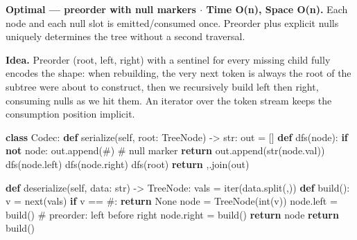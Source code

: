\documentclass[11pt]{article}
\newenvironment{Shaded}{\begin{snugshade}}{\end{snugshade}}
\newcommand{\BuiltInTok}[1]{\textcolor[rgb]{0.50,0.55,0.55}{#1}}
\newcommand{\CommentTok}[1]{\textcolor[rgb]{0.48,0.49,0.49}{#1}}
\newcommand{\ControlFlowTok}[1]{\textcolor[rgb]{0.99,0.74,0.29}{\textbf{#1}}}
\newcommand{\KeywordTok}[1]{\textcolor[rgb]{0.81,0.81,0.76}{\textbf{#1}}}
\newcommand{\NormalTok}[1]{\textcolor[rgb]{0.81,0.81,0.76}{#1}}
\newcommand{\OperatorTok}[1]{\textcolor[rgb]{0.81,0.81,0.76}{#1}}
\newcommand{\StringTok}[1]{\textcolor[rgb]{0.96,0.31,0.31}{#1}}
\newcommand{\VariableTok}[1]{\textcolor[rgb]{0.15,0.68,0.68}{#1}}
\begin{document}
\textbf{Optimal --- preorder with null markers \(\cdot\) Time O(n), Space O(n).} Each node and each null slot is emitted/consumed once. Preorder plus explicit nulls uniquely determines the tree without a second traversal.

\textbf{Idea.} Preorder (root, left, right) with a sentinel for every missing child fully encodes the shape: when rebuilding, the very next token is always the root of the subtree we\textquotesingle re about to construct, then we recursively build left then right, consuming nulls as we hit them. An iterator over the token stream keeps the consumption position implicit.


\begin{Shaded}
\begin{Highlighting}[]
\KeywordTok{class}\NormalTok{ Codec:}
    \KeywordTok{def}\NormalTok{ serialize(}\VariableTok{self}\NormalTok{, root: TreeNode) }\OperatorTok{{-}\textgreater{}} \BuiltInTok{str}\NormalTok{:}
\NormalTok{        out }\OperatorTok{=}\NormalTok{ []}
        \KeywordTok{def}\NormalTok{ dfs(node):}
            \ControlFlowTok{if} \KeywordTok{not}\NormalTok{ node:}
\NormalTok{                out.append(}\StringTok{\textquotesingle{}\#\textquotesingle{}}\NormalTok{)        }\CommentTok{\# null marker}
                \ControlFlowTok{return}
\NormalTok{            out.append(}\BuiltInTok{str}\NormalTok{(node.val))}
\NormalTok{            dfs(node.left)}
\NormalTok{            dfs(node.right)}
\NormalTok{        dfs(root)}
        \ControlFlowTok{return} \StringTok{\textquotesingle{},\textquotesingle{}}\NormalTok{.join(out)}

    \KeywordTok{def}\NormalTok{ deserialize(}\VariableTok{self}\NormalTok{, data: }\BuiltInTok{str}\NormalTok{) }\OperatorTok{{-}\textgreater{}}\NormalTok{ TreeNode:}
\NormalTok{        vals }\OperatorTok{=} \BuiltInTok{iter}\NormalTok{(data.split(}\StringTok{\textquotesingle{},\textquotesingle{}}\NormalTok{))}
        \KeywordTok{def}\NormalTok{ build():}
\NormalTok{            v }\OperatorTok{=} \BuiltInTok{next}\NormalTok{(vals)}
            \ControlFlowTok{if}\NormalTok{ v }\OperatorTok{==} \StringTok{\textquotesingle{}\#\textquotesingle{}}\NormalTok{:}
                \ControlFlowTok{return} \VariableTok{None}
\NormalTok{            node }\OperatorTok{=}\NormalTok{ TreeNode(}\BuiltInTok{int}\NormalTok{(v))}
\NormalTok{            node.left }\OperatorTok{=}\NormalTok{ build()        }\CommentTok{\# preorder: left before right}
\NormalTok{            node.right }\OperatorTok{=}\NormalTok{ build()}
            \ControlFlowTok{return}\NormalTok{ node}
        \ControlFlowTok{return}\NormalTok{ build()}
\end{Highlighting}
\end{Shaded}
\end{document}

